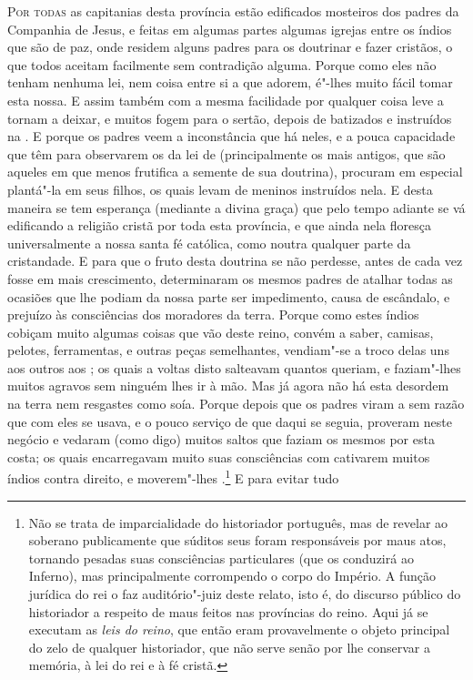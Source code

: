 \noindent\textsc{Por todas} as capitanias desta província estão edificados mosteiros dos
padres da Companhia de Jesus, e feitas em algumas partes algumas igrejas
entre os índios que são de paz, onde residem alguns padres para os			%
doutrinar e fazer cristãos, o que todos aceitam facilmente sem				%
contradição alguma. Porque como eles não tenham nenhuma lei, nem coisa			%
entre si a que adorem, é"-lhes muito fácil tomar esta nossa. E assim			%
também com a mesma facilidade por qualquer coisa leve a tornam a
deixar, e muitos fogem para o sertão, depois de batizados e instruídos
na . E porque os padres veem a inconstância que há
neles, e a pouca capacidade que têm para observarem os  da
lei de  (principalmente os mais antigos, que são aqueles em que
menos frutifica a semente de sua doutrina), procuram em especial
plantá"-la em seus filhos, os quais levam de meninos instruídos nela. E
desta maneira se tem esperança (mediante a divina graça) que pelo tempo
adiante se vá edificando a religião cristã por toda esta província, e
que ainda nela floresça universalmente a nossa santa fé católica, como
noutra qualquer parte da cristandade. E para que o fruto desta
doutrina se não perdesse, antes de cada vez fosse em mais crescimento,
determinaram os mesmos padres de atalhar todas as ocasiões que lhe
podiam da nossa parte ser impedimento, causa de escândalo, e prejuízo
às consciências dos moradores da terra. Porque como estes índios		%
cobiçam muito algumas coisas que vão deste reino, convém a saber,
camisas, pelotes, ferramentas, e outras peças semelhantes, vendiam"-se a	%
troco delas uns aos outros aos ; os quais a voltas disto
salteavam quantos queriam, e faziam"-lhes muitos agravos sem ninguém
lhes ir à mão. Mas já agora não há esta desordem na terra nem resgastes
como soía. Porque depois que os padres viram a sem razão que com eles
se usava, e o pouco serviço de  que daqui se seguia, proveram neste
negócio e vedaram (como digo) muitos saltos que faziam os mesmos
 por esta costa; os quais encarregavam muito suas
consciências com cativarem muitos índios contra direito, e moverem"-lhes
.\footnote{ Não se trata de imparcialidade do
historiador português, mas de revelar ao soberano publicamente que
súditos seus foram responsáveis por maus atos, tornando pesadas suas
consciências particulares (que os conduzirá ao Inferno), mas
principalmente corrompendo o corpo do Império. A função jurídica do rei
o faz auditório"-juiz deste relato, isto é, do discurso público do
historiador a respeito de maus feitos nas províncias do reino. Aqui já
se executam as \textit{leis do reino}, que então eram provavelmente o
objeto principal do zelo de qualquer historiador, que não serve senão
por lhe conservar a memória, à lei do rei e à fé cristã.} E para evitar tudo
